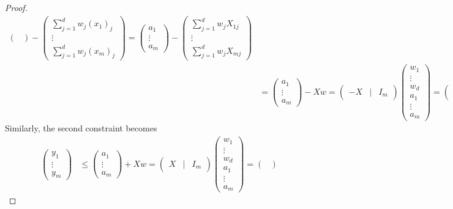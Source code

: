 \documentclass[12pt]{article}
\begin{document}
\begin{proof}
\begin{align*}
\begin{pmatrix}
    \end{pmatrix}
    -
    \begin{pmatrix}
      \sum_{j=1}^{d}w_{j}(x_{1})_{j} \\
      \vdots \\
      \sum_{j=1}^{d}w_{j}(x_{m})_{j}
    \end{pmatrix} = \begin{pmatrix}
      a_{1} \\\vdots\\ a_{m} 
    \end{pmatrix}
    -
    \begin{pmatrix}
      \sum_{j=1}^{d}w_{j}X_{1j} \\
      \vdots \\
      \sum_{j=1}^{d}w_{j}X_{mj}
    \end{pmatrix}\\
    &=\begin{pmatrix}
      a_{1} \\\vdots\\ a_{m} 
    \end{pmatrix} -Xw = 
    \begin{pmatrix}
      -X & \vert& I_{m}
      \end{pmatrix} \begin{pmatrix}w_{1}\\\vdots\\w_{d}\\a_{1}\\\vdots\\a_{m}\end{pmatrix}  = \begin{pmatrix}
      -X & \vert& I_{m}
      \end{pmatrix}u
  \end{align*}
  Similarly, the second constraint becomes
  \begin{align*}
    \begin{pmatrix}
      y_{1}\\\vdots\\ y_{m}
    \end{pmatrix}&\leq
    \begin{pmatrix}
      a_{1} \\\vdots\\ a_{m} 
    \end{pmatrix} +Xw = 
    \begin{pmatrix}
      X & \vert& I_{m}
      \end{pmatrix} \begin{pmatrix}w_{1}\\\vdots\\w_{d}\\a_{1}\\\vdots\\a_{m}\end{pmatrix}  = \begin{pmatrix}

\end{pmatrix}
\end{align*}
\end{proof}
\end{document}
